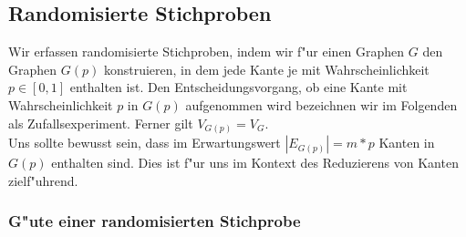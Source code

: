 \subsection{Randomisierte Stichproben}

Wir erfassen randomisierte Stichproben, indem wir f"ur einen Graphen $G$ den
    Graphen $G(p)$ konstruieren, in dem jede Kante je mit Wahrscheinlichkeit 
    $p \in [0,1]$ enthalten ist. 
    Den Entscheidungsvorgang, ob eine Kante mit Wahrscheinlichkeit $p$
    in $G(p)$ aufgenommen wird bezeichnen wir im Folgenden als Zufallsexperiment.
    Ferner gilt $V_{G(p)} = V_G$.\\
Uns sollte bewusst sein, dass im Erwartungswert $|E_{G(p)}| = m * p$ Kanten
    in $G(p)$ enthalten sind.
    Dies ist f"ur uns im Kontext des Reduzierens von Kanten zielf"uhrend.\\

\subsubsection{G"ute einer randomisierten Stichprobe}
\label{sec:goodnessRand}

